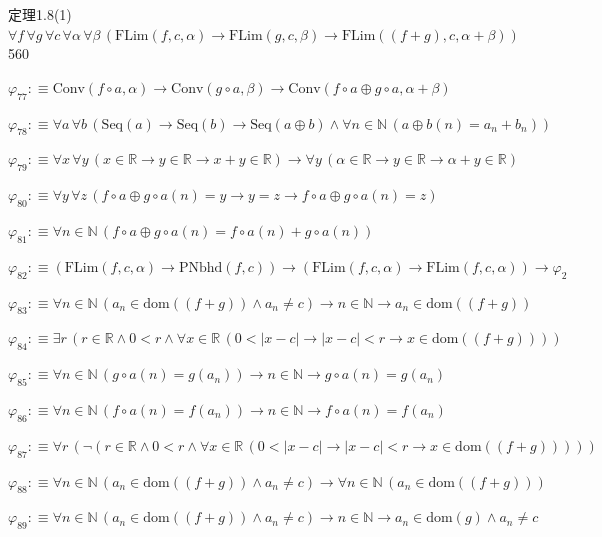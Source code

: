 \begin{fullproof}{定理1.8(1)}{$\forall f\,\forall g\,\forall c\,\forall \alpha\,\forall \beta\,(\mathrm{FLim}(f,c,\alpha) \to \mathrm{FLim}(g,c,\beta) \to \mathrm{FLim}((f + g),c,\alpha + \beta))$}{560}
\begin{abbrevlist}
\item $\varphi_{77} :\equiv \mathrm{Conv}(f \circ a,\alpha) \to \mathrm{Conv}(g \circ a,\beta) \to \mathrm{Conv}(f \circ a \oplus g \circ a,\alpha + \beta)$
\item $\varphi_{78} :\equiv \forall a\,\forall b\,(\mathrm{Seq}(a) \to \mathrm{Seq}(b) \to \mathrm{Seq}(a \oplus b) \land \forall n \in \mathbb{N}\,(a \oplus b(n) = a_{n} + b_{n}))$
\item $\varphi_{79} :\equiv \forall x\,\forall y\,(x \in \mathbb{R} \to y \in \mathbb{R} \to x + y \in \mathbb{R}) \to \forall y\,(\alpha \in \mathbb{R} \to y \in \mathbb{R} \to \alpha + y \in \mathbb{R})$
\item $\varphi_{80} :\equiv \forall y\,\forall z\,(f \circ a \oplus g \circ a(n) = y \to y = z \to f \circ a \oplus g \circ a(n) = z)$
\item $\varphi_{81} :\equiv \forall n \in \mathbb{N}\,(f \circ a \oplus g \circ a(n) = f \circ a(n) + g \circ a(n))$
\item $\varphi_{82} :\equiv (\mathrm{FLim}(f,c,\alpha) \to \mathrm{PNbhd}(f,c)) \to (\mathrm{FLim}(f,c,\alpha) \to \mathrm{FLim}(f,c,\alpha)) \to \varphi_{2}$
\item $\varphi_{83} :\equiv \forall n \in \mathbb{N}\,(a_{n} \in \mathrm{dom}((f + g)) \land a_{n} \neq c) \to n \in \mathbb{N} \to a_{n} \in \mathrm{dom}((f + g))$
\item $\varphi_{84} :\equiv \exists r\,(r \in \mathbb{R} \land 0 < r \land \forall x \in \mathbb{R}\,(0 < \lvert x - c \rvert \to \lvert x - c \rvert < r \to x \in \mathrm{dom}((f + g))))$
\item $\varphi_{85} :\equiv \forall n \in \mathbb{N}\,(g \circ a(n) = g(a_{n})) \to n \in \mathbb{N} \to g \circ a(n) = g(a_{n})$
\item $\varphi_{86} :\equiv \forall n \in \mathbb{N}\,(f \circ a(n) = f(a_{n})) \to n \in \mathbb{N} \to f \circ a(n) = f(a_{n})$
\item $\varphi_{87} :\equiv \forall r\,(\neg (r \in \mathbb{R} \land 0 < r \land \forall x \in \mathbb{R}\,(0 < \lvert x - c \rvert \to \lvert x - c \rvert < r \to x \in \mathrm{dom}((f + g)))))$
\item $\varphi_{88} :\equiv \forall n \in \mathbb{N}\,(a_{n} \in \mathrm{dom}((f + g)) \land a_{n} \neq c) \to \forall n \in \mathbb{N}\,(a_{n} \in \mathrm{dom}((f + g)))$
\item $\varphi_{89} :\equiv \forall n \in \mathbb{N}\,(a_{n} \in \mathrm{dom}((f + g)) \land a_{n} \neq c) \to n \in \mathbb{N} \to a_{n} \in \mathrm{dom}(g) \land a_{n} \neq c$

\end{abbrevlist}
\end{fullproof}
